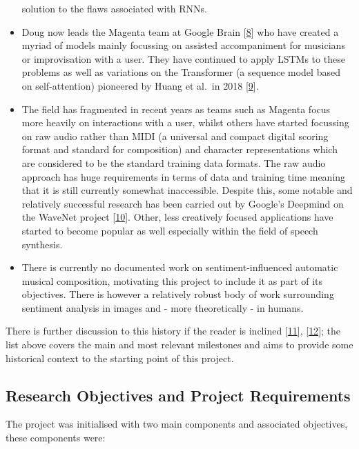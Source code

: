 \documentclass[12pt,]{article}
\begin{document}
\begin{itemize}
  solution to the flaws associated with RNNs.
\item
  Doug now leads the Magenta team at Google Brain
  {[}\protect\hyperlink{ref-magenta}{8}{]} who have created a myriad of
  models mainly focussing on assisted accompaniment for musicians or
  improvisation with a user. They have continued to apply LSTMs to these
  problems as well as variations on the Transformer (a sequence model
  based on self-attention) pioneered by Huang et al.~in 2018
  {[}\protect\hyperlink{ref-huang2018improved}{9}{]}.
\item
  The field has fragmented in recent years as teams such as Magenta
  focus more heavily on interactions with a user, whilst others have
  started focussing on raw audio rather than MIDI (a universal and
  compact digital scoring format and standard for composition) and
  character representations which are considered to be the standard
  training data formats. The raw audio approach has huge requirements in
  terms of data and training time meaning that it is still currently
  somewhat inaccessible. Despite this, some notable and relatively
  successful research has been carried out by Google's Deepmind on the
  WaveNet project {[}\protect\hyperlink{ref-oord2016wavenet}{10}{]}.
  Other, less creatively focused applications have started to become
  popular as well especially within the field of speech synthesis.
\item
  There is currently no documented work on sentiment-influenced
  automatic musical composition, motivating this project to include it
  as part of its objectives. There is however a relatively robust body
  of work surrounding sentiment analysis in images and - more
  theoretically - in humans.
\end{itemize}

There is further discussion to this history if the reader is inclined
{[}\protect\hyperlink{ref-mediumkylemcdonald}{11}{]},
{[}\protect\hyperlink{ref-libdlmusic}{12}{]}; the list above covers the
main and most relevant milestones and aims to provide some historical
context to the starting point of this project.

\hypertarget{research-objectives-and-project-requirements}{%
\subsection{Research Objectives and Project
Requirements}\label{research-objectives-and-project-requirements}}

The project was initialised with two main components and associated
objectives, these components were:
\end{document}

